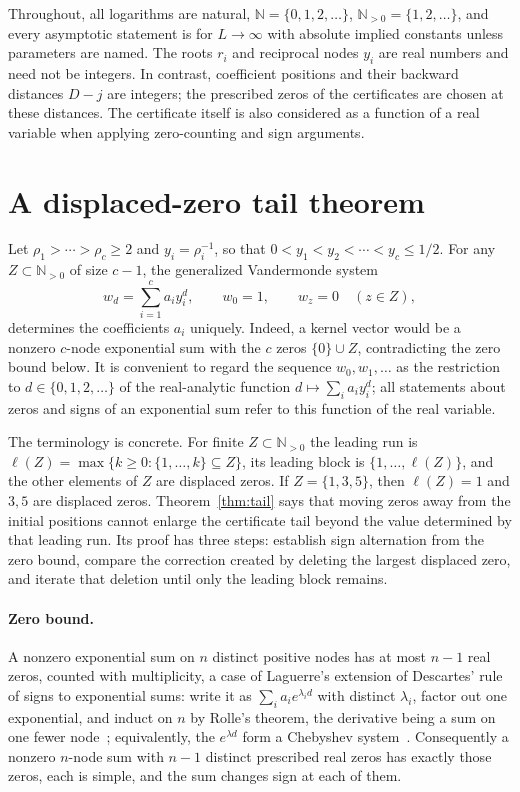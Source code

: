 \documentclass[11pt]{article}
\newcommand{\N}{\mathbb N}
\begin{document}
Throughout, all logarithms are natural, $\N=\{0,1,2,\ldots\}$,
$\N_{>0}=\{1,2,\ldots\}$, and every asymptotic
statement is for $L\to\infty$ with absolute implied constants unless
parameters are named.
The roots $r_i$ and reciprocal nodes $y_i$ are real numbers and need not be
integers.  In contrast, coefficient positions and their backward distances
$D-j$ are integers; the prescribed zeros of the certificates are chosen at
these distances.  The certificate itself is also considered as a function
of a real variable when applying zero-counting and sign arguments.

\section{A displaced-zero tail theorem}\label{sec:tail}

Let $\rho_1>\cdots>\rho_c\ge2$ and $y_i=\rho_i^{-1}$, so that
$0<y_1<y_2<\cdots<y_c\le1/2$.  For any $Z\subset\N_{>0}$ of size $c-1$, the
generalized Vandermonde system
\[
  w_d=\sum_{i=1}^c a_i y_i^d,
  \qquad w_0=1,
  \qquad w_z=0\quad(z\in Z),
\]
determines the coefficients $a_i$ uniquely.  Indeed, a kernel vector would be
a nonzero $c$-node exponential sum with the $c$ zeros $\{0\}\cup Z$,
contradicting the zero bound below.  It is convenient to regard the sequence
$w_0,w_1,\ldots$ as the restriction to $d\in\{0,1,2,\ldots\}$ of the
real-analytic function $d\mapsto\sum_ia_iy_i^d$; all statements about zeros
and signs of an exponential sum refer to this function of the real variable.

The terminology is concrete.  For finite $Z\subset\N_{>0}$ the leading run
is $\ell(Z)=\max\{k\ge0:\{1,\ldots,k\}\subseteq Z\}$, its leading block is
$\{1,\ldots,\ell(Z)\}$, and the other elements of $Z$ are displaced zeros.
If $Z=\{1,3,5\}$, then $\ell(Z)=1$ and $3,5$ are displaced zeros.  Theorem~\ref{thm:tail} says that
moving zeros away from the initial positions cannot enlarge the certificate
tail beyond the value determined by that leading run.  Its proof has three
steps: establish sign alternation from the zero bound, compare the correction
created by deleting the largest displaced zero, and iterate that deletion
until only the leading block remains.

\paragraph{Zero bound.}
A nonzero exponential sum on $n$ distinct positive nodes has at most $n-1$
real zeros, counted with multiplicity, a case of Laguerre's extension of
Descartes' rule of signs to exponential sums: write it as $\sum_ia_ie^{\lambda_id}$
with distinct $\lambda_i$, factor out one exponential, and induct on $n$ by
Rolle's theorem, the derivative being a sum on one fewer
node~\cite[Part~Five, Ch.~1]{polya-szego}; equivalently, the $e^{\lambda d}$
form a Chebyshev system~\cite{karlin}.
Consequently a nonzero $n$-node sum with $n-1$
distinct prescribed real zeros has exactly those zeros, each is simple, and the sum
changes sign at each of them.
\end{document}
